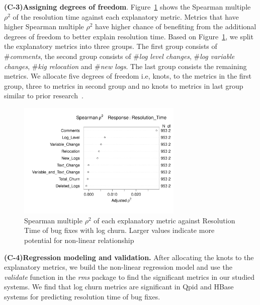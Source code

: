 \textbf{(C-3)Assigning degrees of freedom}. Figure~\ref{fig:Spearman} shows the Spearman multiple $\rho^{2}$ of the resolution time against each explanatory metric. Metrics that have higher Spearman multiple $\rho^{2}$ have higher chance of benefiting from the additional degrees of freedom to better explain resolution time. Based on Figure~\ref{fig:Spearman}, we split the explanatory metrics into three groups. The first group consists of \#\textsl{comments}, the second group consists of \#\textsl{log level changes}, \#\textsl{log variable changes}, \#\textsl{kig relocation} and \#\textsl{new logs}. The last group consists the remaining metrics. We allocate five degrees of freedom i.e, knots, to the metrics in the first group, three to metrics in second group and no knots to metrics in last group similar to prior research~\cite{ShaneOLS}.


\begin{figure}[t]
	\begin{minipage}[b]{1\columnwidth}
			\centering 
		\hspace*{-2cm}	\includegraphics[width=0.7\textwidth]{QpidDF}	
		
	\end{minipage}
	\captionsetup{labelsep = colon}
	\hspace*{1.7cm}\caption{Spearman multiple $\rho^{2}$ of each explanatory metric against Resolution Time of bug fixes with log churn. Larger values indicate more potential for non-linear relationship \label{fig:Spearman}}
\end{figure}




\textbf{(C-4)Regression modeling and validation.} After allocating the knots to the explanatory metrics, we build the non-linear regression model and use the \textsl{validate} function in the \textsl{rms} package to find the significant metrics in our studied systems. We find that log churn metrics are significant in Qpid and HBase systems for predicting resolution time of bug fixes. 

